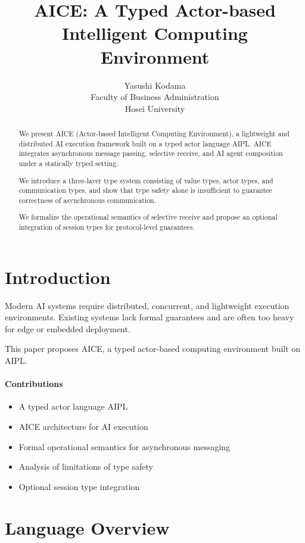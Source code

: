 \documentclass[11pt]{article}
\title{AICE: A Typed Actor-based Intelligent Computing Environment}
\author{
Yasushi Kodama\\
Faculty of Business Administration\\
Hosei University
}
\date{}
\begin{document}
\maketitle

\begin{abstract}
We present AICE (Actor-based Intelligent Computing Environment), a lightweight and distributed AI execution framework built on a typed actor language AIPL. AICE integrates asynchronous message passing, selective receive, and AI agent composition under a statically typed setting.

We introduce a three-layer type system consisting of value types, actor types, and communication types, and show that type safety alone is insufficient to guarantee correctness of asynchronous communication.

We formalize the operational semantics of selective receive and propose an optional integration of session types for protocol-level guarantees.
\end{abstract}

\section{Introduction}

Modern AI systems require distributed, concurrent, and lightweight execution environments. Existing systems lack formal guarantees and are often too heavy for edge or embedded deployment.

This paper proposes AICE, a typed actor-based computing environment built on AIPL.

\paragraph{Contributions}
\begin{itemize}
\item A typed actor language AIPL
\item AICE architecture for AI execution
\item Formal operational semantics for asynchronous messaging
\item Analysis of limitations of type safety
\item Optional session type integration
\end{itemize}

\section{Language Overview}
\end{document}

